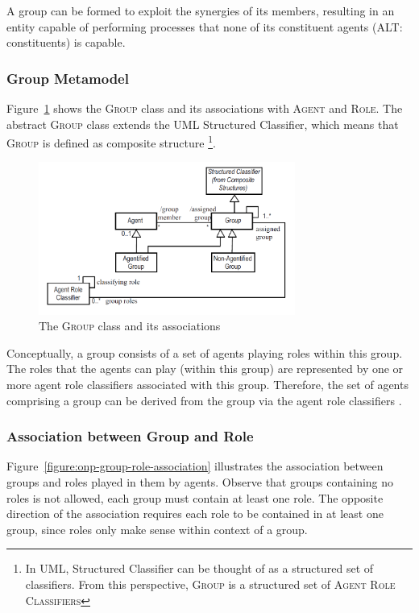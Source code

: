 A group can be formed to exploit the synergies of its members, resulting in an entity capable of performing processes that none of its constituent agents (ALT: constituents) is capable.

\subsubsection*{Group Metamodel}

Figure~\ref{figure:onp-group} shows the \textsc{Group} class and its associations with \textsc{Agent} and \textsc{Role}.
The abstract \textsc{Group} class extends the UML Structured Classifier, which means that \textsc{Group} is defined as composite structure \footnote{In UML, Structured Classifier can be thought of as a structured set of classifiers. From this perspective, \textsc{Group} is a structured set of \textsc{Agent Role Classifiers}}.

\begin{figure}[h]
	\centering
	\includegraphics[width=0.75\textwidth]{images/onp-group.png}
	\caption{The \textsc{Group} class and its associations}
	\label{figure:onp-group}
\end{figure}

Conceptually, a group consists of a set of agents playing roles within this group.
The roles that the agents can play (within this group) are represented by one or more agent role classifiers associated with this group.
Therefore, the set of agents comprising a group can be derived from the group via the agent role classifiers \cite{Odell05}.

\subsubsection*{Association between Group and Role}

Figure~\ref{figure:onp-group-role-association} illustrates the association between groups and roles played in them by agents.
Observe that groups containing no roles is not allowed, each group must contain at least one role.
The opposite direction of the association requires each role to be contained in at least one group, since roles only make sense within context of a group.


